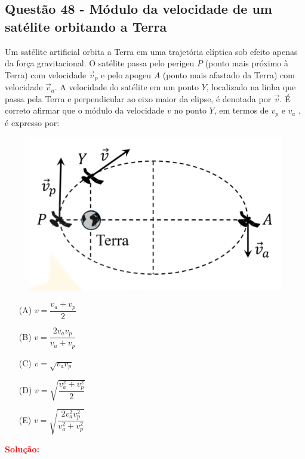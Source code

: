 \documentclass[a4paper,12pt]{article}
\begin{document}
\begin{flushleft}
\subsection{Questão 48 - Módulo da velocidade de um satélite orbitando a Terra}
Um satélite artificial orbita a Terra em uma trajetória elíptica sob efeito apenas da
força gravitacional. O satélite passa pelo perigeu $P$ (ponto mais próximo à Terra) com velocidade $\vec{v}_p$ e
pelo apogeu $A$ (ponto mais afastado da Terra) com velocidade $\vec{v}_a$. A velocidade do satélite em um
ponto $Y$, localizado na linha que passa pela Terra e perpendicular ao eixo maior da elipse, é denotada
por $\vec{v}$. É correto afirmar que o módulo da velocidade $v$ no ponto $Y$, em termos de $v_p$ e $v_a$ , é expresso
por:

\begin{figure}[!h]
  \centering
  \includegraphics[scale=0.6]{figures/satelite.png}
\end{figure}

\begin{itemize}
\item[(A)] $v = \dfrac{v_a+v_p}{2}$
\item[(B)] $v = \dfrac{2v_av_p}{v_a+v_p}$
\item[(C)] $v = \sqrt{v_av_p}$
\item[(D)] $v = \sqrt{\dfrac{v_a^2+v_p^2}{2}}$
\item[(E)] $v = \sqrt{\dfrac{2v_a^2v_p^2}{v_a^2+v_p^2}}$
\end{itemize}

\vspace{0.5cm}

\textcolor{red}{\textbf{Solução:}}\\


\end{flushleft}
\end{document}
